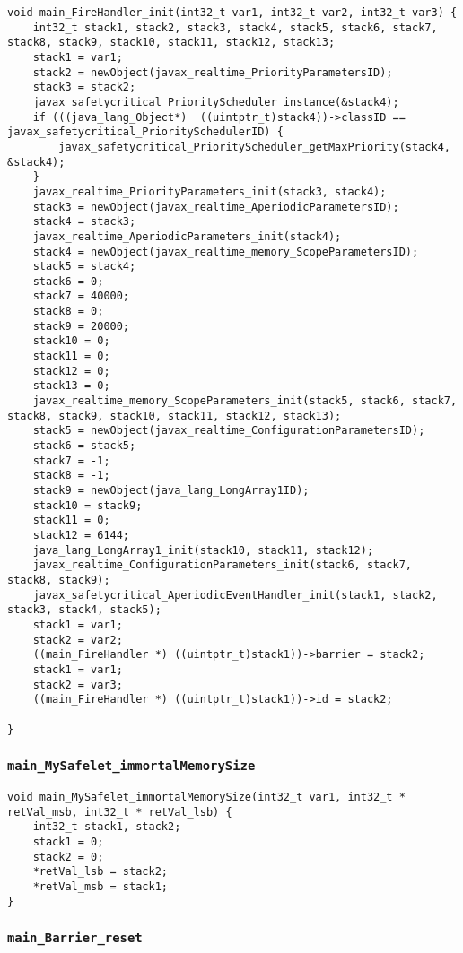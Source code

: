 \begin{landscape}
\begin{multicols}{2}
\begin{lstlisting}[firstnumber=2261]
void main_FireHandler_init(int32_t var1, int32_t var2, int32_t var3) {
	int32_t stack1, stack2, stack3, stack4, stack5, stack6, stack7, stack8, stack9, stack10, stack11, stack12, stack13;
	stack1 = var1;
	stack2 = newObject(javax_realtime_PriorityParametersID);
	stack3 = stack2;
	javax_safetycritical_PriorityScheduler_instance(&stack4);
	if (((java_lang_Object*)  ((uintptr_t)stack4))->classID == javax_safetycritical_PrioritySchedulerID) {
		javax_safetycritical_PriorityScheduler_getMaxPriority(stack4, &stack4);
	}
	javax_realtime_PriorityParameters_init(stack3, stack4);
	stack3 = newObject(javax_realtime_AperiodicParametersID);
	stack4 = stack3;
	javax_realtime_AperiodicParameters_init(stack4);
	stack4 = newObject(javax_realtime_memory_ScopeParametersID);
	stack5 = stack4;
	stack6 = 0;
	stack7 = 40000;
	stack8 = 0;
	stack9 = 20000;
	stack10 = 0;
	stack11 = 0;
	stack12 = 0;
	stack13 = 0;
	javax_realtime_memory_ScopeParameters_init(stack5, stack6, stack7, stack8, stack9, stack10, stack11, stack12, stack13);
	stack5 = newObject(javax_realtime_ConfigurationParametersID);
	stack6 = stack5;
	stack7 = -1;
	stack8 = -1;
	stack9 = newObject(java_lang_LongArray1ID);
	stack10 = stack9;
	stack11 = 0;
	stack12 = 6144;
	java_lang_LongArray1_init(stack10, stack11, stack12);
	javax_realtime_ConfigurationParameters_init(stack6, stack7, stack8, stack9);
	javax_safetycritical_AperiodicEventHandler_init(stack1, stack2, stack3, stack4, stack5);
	stack1 = var1;
	stack2 = var2;
	((main_FireHandler *) ((uintptr_t)stack1))->barrier = stack2;
	stack1 = var1;
	stack2 = var3;
	((main_FireHandler *) ((uintptr_t)stack1))->id = stack2;

}
\end{lstlisting}

\subsubsection{\texttt{main\_MySafelet\_immortalMemorySize}}

\begin{lstlisting}[firstnumber=2354]
void main_MySafelet_immortalMemorySize(int32_t var1, int32_t * retVal_msb, int32_t * retVal_lsb) {
	int32_t stack1, stack2;
	stack1 = 0;
	stack2 = 0;
	*retVal_lsb = stack2;
	*retVal_msb = stack1;
}
\end{lstlisting}

\subsubsection{\texttt{main\_Barrier\_reset}}


\end{multicols}
\end{landscape}

